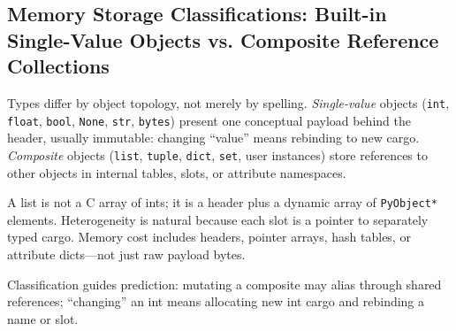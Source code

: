 \subsection{Memory Storage Classifications: Built-in Single-Value Objects vs. Composite Reference Collections}

Types differ by object topology, not merely by spelling. \emph{Single-value} objects (\texttt{int}, \texttt{float}, \texttt{bool}, \texttt{None}, \texttt{str}, \texttt{bytes}) present one conceptual payload behind the header, usually immutable: changing ``value'' means rebinding to new cargo. \emph{Composite} objects (\texttt{list}, \texttt{tuple}, \texttt{dict}, \texttt{set}, user instances) store references to other objects in internal tables, slots, or attribute namespaces.

A list is not a C array of ints; it is a header plus a dynamic array of \texttt{PyObject*} elements. Heterogeneity is natural because each slot is a pointer to separately typed cargo. Memory cost includes headers, pointer arrays, hash tables, or attribute dicts---not just raw payload bytes.

Classification guides prediction: mutating a composite may alias through shared references; ``changing'' an int means allocating new int cargo and rebinding a name or slot.
